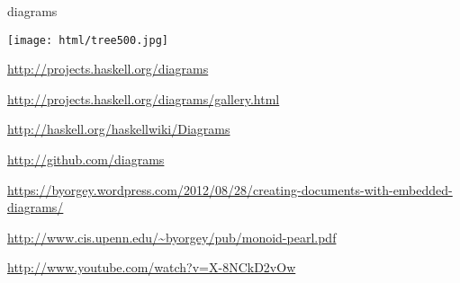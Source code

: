 \begin{hcarentry}[updated]{diagrams}
\begin{center}
\texttt{[image: html/tree500.jpg]}
\end{center}

\FurtherReading
\begin{compactitem}
\item \url{http://projects.haskell.org/diagrams}
\item \url{http://projects.haskell.org/diagrams/gallery.html}
\item \url{http://haskell.org/haskellwiki/Diagrams}
\item \url{http://github.com/diagrams}
\item \url{https://byorgey.wordpress.com/2012/08/28/creating-documents-with-embedded-diagrams/}
\item \url{http://www.cis.upenn.edu/~byorgey/pub/monoid-pearl.pdf}
\item \url{http://www.youtube.com/watch?v=X-8NCkD2vOw}
\end{compactitem}
\end{hcarentry}
